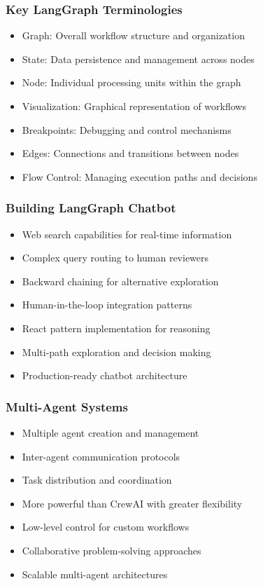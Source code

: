 \begin{frame}[fragile]\frametitle{Key LangGraph Terminologies}
      \begin{itemize}
        \item Graph: Overall workflow structure and organization
        \item State: Data persistence and management across nodes
        \item Node: Individual processing units within the graph
        \item Visualization: Graphical representation of workflows
        \item Breakpoints: Debugging and control mechanisms
        \item Edges: Connections and transitions between nodes
        \item Flow Control: Managing execution paths and decisions
      \end{itemize}
\end{frame}

\begin{frame}[fragile]\frametitle{Building LangGraph Chatbot}
      \begin{itemize}
        \item Web search capabilities for real-time information
        \item Complex query routing to human reviewers
        \item Backward chaining for alternative exploration
        \item Human-in-the-loop integration patterns
        \item React pattern implementation for reasoning
        \item Multi-path exploration and decision making
        \item Production-ready chatbot architecture
      \end{itemize}
\end{frame}

\begin{frame}[fragile]\frametitle{Multi-Agent Systems}
      \begin{itemize}
        \item Multiple agent creation and management
        \item Inter-agent communication protocols
        \item Task distribution and coordination
        \item More powerful than CrewAI with greater flexibility
        \item Low-level control for custom workflows
        \item Collaborative problem-solving approaches
        \item Scalable multi-agent architectures
      \end{itemize}
\end{frame}

